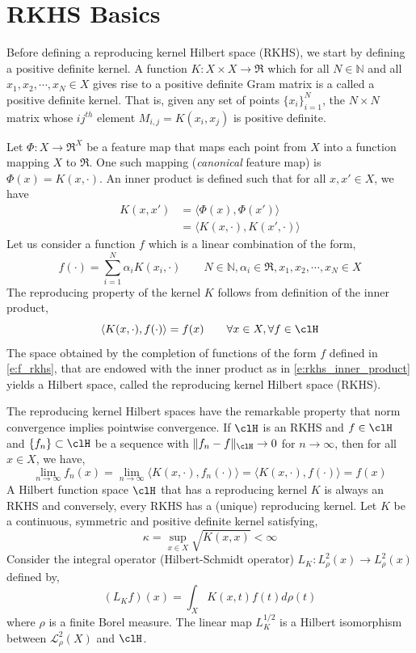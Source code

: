 \section{RKHS Basics}
\label{rkhs_basics}
Before defining a reproducing kernel Hilbert space (RKHS), we start by defining a positive definite kernel. A function $K : X \times X \to \Re$ which for all $N \in \mathbb{N}$ and all $x_1,x_2,\cdots,x_N \in X$ gives rise to a positive definite Gram matrix is a called a positive definite kernel. That is, given any set of points $\{x_i\}_{i=1}^N$, the $N\times N $ matrix whose $ij^{th}$ element $M_{i,j} = K(x_i,x_j)$ is positive definite.  

Let $\Phi: X \to \Re^X$ be a feature map that maps each point from $X$ into a function mapping $X$ to $\Re$. One such mapping (\textit{canonical} feature map) is $\Phi(x) = K(x,\cdot)$. An inner product is defined such that for all $x,x' \in X$, we have
\begin{equation}
\begin{aligned}
K(x,x') &= \langle \Phi(x), \Phi(x')\rangle \\
& = \langle K(x,\cdot), K(x',\cdot)\rangle
\end{aligned}
\label{e:rkhs_inner_product}
\end{equation}
Let us consider a function $f$ which is a linear combination of the form,
\begin{equation}
f(\cdot) = \sum_{i=1}^N \alpha_i K(x_i, \cdot) \qquad N \in \mathbb{N}, \alpha_i \in \Re, x_1,x_2,\cdots, x_N \in X
\label{e:f_rkhs}
\end{equation}
The reproducing property of the kernel $K$ follows from definition of the inner product,
\[
\langle K(x,\cdot), f(\cdot)\rangle = f(x) \qquad \forall x \in X, \forall f \in \clH
\]
The space obtained by the completion of functions of the form $f$ defined in \eqref{e:f_rkhs}, that are endowed with the inner product as in \eqref{e:rkhs_inner_product} yields a Hilbert space, called the reproducing kernel Hilbert space (RKHS). 

The reproducing kernel Hilbert spaces have the remarkable property that norm convergence implies pointwise convergence. 
If $\clH$ is an RKHS and $f\in\clH$ and $\{f_n\}\subset \clH$ be a sequence with $\|f_n - f\|_\clH \to 0$ for $n \to \infty$, then for all $x \in X$, we have,
\[
\lim_{n\to\infty} f_n(x) = \lim_{n \to \infty} \langle K(x,\cdot),  f_n(\cdot) \rangle = \langle K(x, \cdot), f(\cdot) \rangle = f(x)
\]
A Hilbert function space $\clH$ that has a reproducing kernel $K$ is always an RKHS and conversely, every RKHS has a (unique) reproducing kernel.  Let $K$ be a continuous, symmetric and positive definite kernel satisfying, 
\[
\kappa = \sup_{x \in X} \sqrt{K(x,x)} < \infty
\]
Consider the integral operator (Hilbert-Schmidt operator) $L_K:L^2_\rho(x) \to L^2_\rho(x)$ defined by,
\[
(L_K f)(x) = \int_X K(x,t) f(t) d\rho(t)
\]
where $\rho$ is a finite Borel measure.
The linear map $L_K^{1/2}$ is a Hilbert isomorphism between $\mathcal{L}^2_{\rho}(X)$ and $\clH$. 

